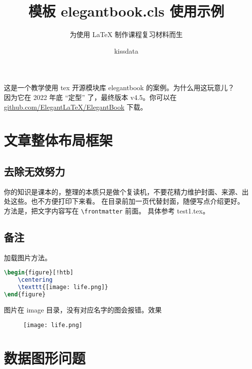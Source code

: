 \documentclass[lang=cn,newtx,10pt,scheme=chinese]{elegantbook}
\title{模板 elegantbook.cls 使用示例}
\subtitle{为使用 \LaTeX{} 制作课程复习材料而生}
\author{kissdata}
\begin{document}
	
	\maketitle %

这是一个教学使用 tex 开源模块库 elegantbook 的案例。为什么用这玩意儿？\\
因为它在 2022 年底 “定型” 了，最终版本 v4.5。你可以在
\href{https://github.com/ElegantLaTeX/ElegantBook/releases}{github.com/ElegantLaTeX/ElegantBook} 下载。

	\frontmatter  %
	\tableofcontents %
	\mainmatter %



\chapter{文章整体布局框架}
	
	\section{去除无效努力}
	
	你的知识是课本的，整理的本质只是做个复读机，不要花精力维护封面、来源、出处这些。也不方便打印下来看。
	在目录前加一页代替封面，随便写点介绍更好。方法是，把文字内容写在 \lstinline|\frontmatter| 前面。
	具体参考 test1.tex。

	\section*{备注}
	
	加载图片方法。

\begin{lstlisting}[language=tex]
\begin{figure}[!htb]
	\centering
	\texttt{[image: life.png]}
\end{figure}
\end{lstlisting}

图片在 image 目录，没有对应名字的图会报错。效果

	\begin{figure}[!htb]
		\centering
		\texttt{[image: life.png]}
	\end{figure}



\chapter{数据图形问题}
\end{document}
